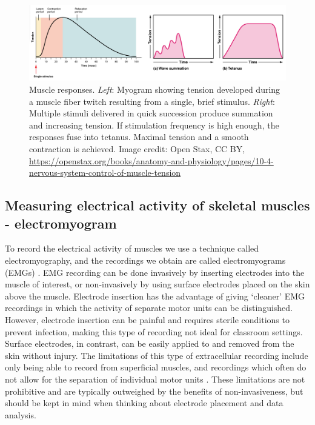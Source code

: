 \documentclass{article}
\begin{document}
\begin{figure}[!htbp]
\centering
\includegraphics[width=1\linewidth]{files/EPpXta8zJdzN048lz8AR-3353691ed4a41a3c6330237d90e8acae.png}
\caption[]{Muscle responses. \textit{Left}: Myogram showing tension developed during a muscle fiber twitch resulting from a single, brief stimulus. \textit{Right}: Multiple stimuli delivered in quick succession produce summation and increasing tension. If stimulation frequency is high enough, the responses fuse into tetanus. Maximal tension and a smooth contraction is achieved. Image credit: Open Stax, CC BY, \href{https://openstax.org/books/anatomy-and-physiology/pages/10-4-nervous-system-control-of-muscle-tension}{https://openstax.org/books/anatomy-and-physiology/pages/10-4-nervous-system-control-of-muscle-tension}}
\label{qJqtIbeqR2}
\end{figure}

\subsection{Measuring electrical activity of skeletal muscles - electromyogram}

To record the electrical activity of muscles we use a technique called electromyography, and the recordings we obtain are called electromyograms (EMGs) \citep{garcia2011surface}. EMG recording can be done invasively by inserting electrodes into the muscle of interest, or non-invasively by using surface electrodes placed on the skin above the muscle. Electrode insertion has the advantage of giving `cleaner' EMG recordings in which the activity of separate motor units can be distinguished. However, electrode insertion can be painful and requires sterile conditions to prevent infection, making this type of recording not ideal for classroom settings. Surface electrodes, in contrast, can be easily applied to and removed from the skin without injury. The limitations of this type of extracellular recording include only being able to record from superficial muscles, and recordings which often do not allow for the separation of individual motor units \citep{garcia2011surface}. These limitations are not prohibitive and are typically outweighed by the benefits of non-invasiveness, but should be kept in mind when thinking about electrode placement and data analysis.
\end{document}
